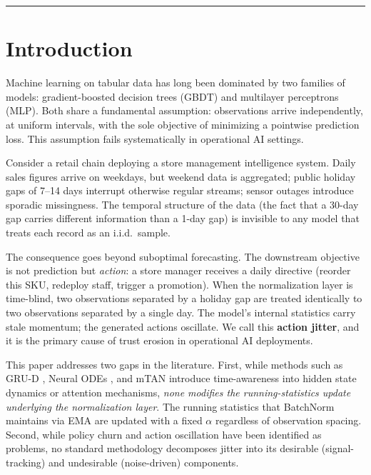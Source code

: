 \documentclass[11pt,a4paper]{article}
\begin{document}
\vspace{6pt}
{\color{steelgray}\rule{\linewidth}{0.4pt}}
\vspace{6pt}

\section{Introduction}

Machine learning on tabular data has long been dominated by two families of models:
gradient-boosted decision trees (GBDT) and multilayer perceptrons (MLP). Both share
a fundamental assumption: observations arrive independently, at uniform intervals,
with the sole objective of minimizing a pointwise prediction loss. This assumption
fails systematically in operational AI settings.

Consider a retail chain deploying a store management intelligence system. Daily
sales figures arrive on weekdays, but weekend data is aggregated; public holiday
gaps of 7--14 days interrupt otherwise regular streams; sensor outages introduce
sporadic missingness. The temporal structure of the data (the fact that a 30-day
gap carries different information than a 1-day gap) is invisible to
any model that treats each record as an i.i.d.\ sample.

The consequence goes beyond suboptimal forecasting. The downstream objective is
not prediction but \emph{action}: a store manager receives a daily directive
(reorder this SKU, redeploy staff, trigger a promotion). When the
normalization layer is time-blind, two observations separated by a holiday gap are
treated identically to two observations separated by a single day. The model's
internal statistics carry stale momentum; the generated actions oscillate. We call
this \textbf{action jitter}, and it is the primary cause of trust erosion in
operational AI deployments.

This paper addresses two gaps in the literature. First, while methods such as
GRU-D \citep{che2018recurrent}, Neural ODEs \citep{chen2018neural}, and mTAN
\citep{shukla2021multi} introduce time-awareness into hidden state dynamics or
attention mechanisms, \emph{none modifies the running-statistics update underlying
the normalization layer}. The running statistics that BatchNorm maintains via
EMA are updated with a fixed $\alpha$ regardless of observation spacing. Second, while policy churn
\citep{schaul2022policy} and action oscillation \citep{chen2021action} have been
identified as problems, no standard methodology decomposes jitter into its desirable
(signal-tracking) and undesirable (noise-driven) components.
\end{document}
